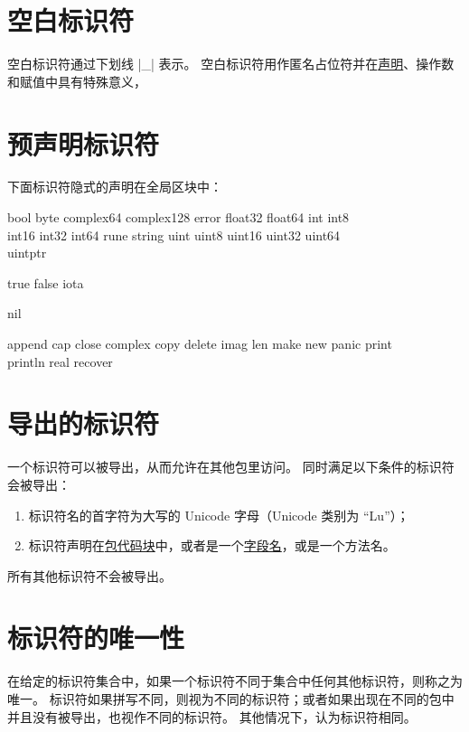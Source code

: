 \section{空白标识符} \label{sec:blank identifier}
空白标识符通过下划线 \gocode|_| 表示。
空白标识符用作匿名占位符并在\hyperref[ch:declarations and scope]{声明}、操作数和赋值中具有特殊意义，

\section{预声明标识符}
下面标识符隐式的声明在全局区块中：
\begin{description}[style=nextline,leftmargin=3\parindent]
\item[Types:] 	
	{\ttfamily bool byte complex64 complex128 error float32 float64 int int8 \\ int16 int32 int64 rune string	uint uint8 uint16 uint32 uint64 \\ uintptr}
\item[Constants:] 
	{\ttfamily true false iota}
\item[Zero value:] 
	{\ttfamily nil}
\item[Functions:] 
	{\ttfamily append cap close complex copy delete imag len make new panic print \\ println real recover}
\end{description}


\section{导出的标识符} \label{sec:exported identifiers}
一个标识符可以被导出，从而允许在其他包里访问。
同时满足以下条件的标识符会被导出：
\begin{enumerate}
\item 标识符名的首字符为大写的 Unicode 字母（Unicode 类别为 ``Lu''）；
\item 标识符声明在\hyperref[ch:blocks]{包代码块}中，或者是一个\hyperref[sec:struct types]{字段名}，或是一个方法名。
\end{enumerate}
所有其他标识符不会被导出。

\section{标识符的唯一性} \label{sec:uniqueness of identifiers}
在给定的标识符集合中，如果一个标识符不同于集合中任何其他标识符，则称之为唯一。
标识符如果拼写不同，则视为不同的标识符；或者如果出现在不同的包中并且没有被导出，也视作不同的标识符。
其他情况下，认为标识符相同。

